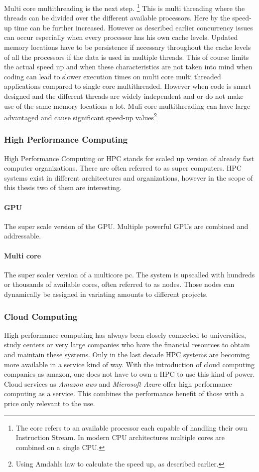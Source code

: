 \par 
Multi core multithreading is the next step. \footnote{The core refers to an available processor each capable of handling their own Instruction Stream. In modern CPU architectures multiple cores are combined on a single CPU.}
This is multi threading where the threads can be divided over the different available processors. 
Here by the speed-up time can be further increased.
However as described earlier concurrency issues can occur especially when every processor has his own cache levels. 
Updated memory locations have to be persistence if necessary throughout the cache levels of all the processors if the data is used in multiple threads. 
This of course limits the actual speed up and when these characteristics are not taken into mind when coding can lead to slower execution times on multi core multi threaded applications compared to single core multithreaded.
However when code is smart designed and the different threads are widely independent and or do not make use of the same memory locations a lot. 
Muli core multithreading can have large advantaged and cause significant speed-up values\footnote{Using Amdahls law to calculate the speed up, as described earlier.}
\subsubsection{High Performance Computing}
High Performance Computing or HPC stands for scaled up version of already fast computer organizations.
There are often referred to as super computers.
HPC systems exist in different architectures and organizations, however in the scope of this thesis two of them are interesting.
\paragraph{GPU}
The super scale version of the GPU.
Multiple powerful GPUs are combined and addressable.

\paragraph{Multi core}
The super scaler version of a multicore pc.
The system is upscalled with hundreds or thousands of available cores, often referred to as nodes.
Those nodes can dynamically be assigned in variating amounts to different projects.

\subsubsection{Cloud Computing}
High performance computing has always been closely connected to universities, study centers or very large companies who have the financial resources to obtain and maintain these systems.
Only in the last decade HPC systems are becoming more available in a service kind of way.
With the introduction of cloud computing companies as amazon, one does not have to own a HPC to use this kind of power.
Cloud services as \textit{Amazon aws} and \textit{Microsoft Azure} offer high performance computing as a service.
This combines the performance benefit of those with a price only relevant to the use.\cite{AmazonWe74:online}\cite{CloudCom84:online}
